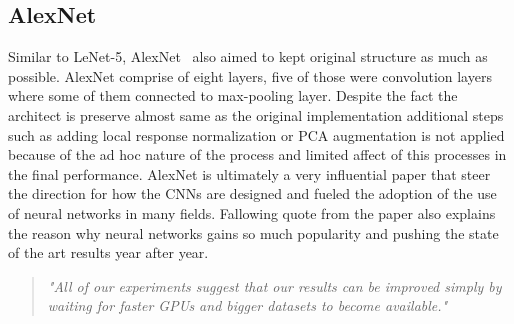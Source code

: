 \subsection{AlexNet}
Similar to LeNet-5, AlexNet~\cite{Alexnet} also aimed to kept original structure as much as possible.
AlexNet comprise of eight layers, five of those were convolution layers where some of them connected to max-pooling layer. 
Despite the fact the architect is preserve almost same as the original implementation additional steps such as adding local response normalization or PCA augmentation is not applied because of the ad hoc nature of the process and limited affect of this processes in the final performance.
AlexNet is ultimately a very influential paper that steer the direction for how the CNNs are designed and fueled the adoption of the use of neural networks in many fields.
Fallowing quote from the paper also explains the reason why neural networks gains so much popularity and pushing the state of the art results year after year.
\begin{quote}
    \textit{"All of our experiments suggest that our results
can be improved simply by waiting for faster GPUs and bigger datasets to become available."}
\end{quote}

